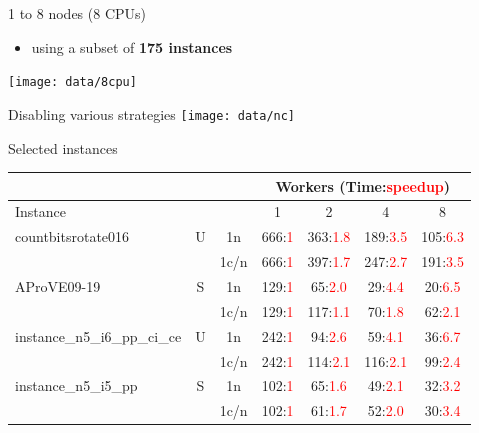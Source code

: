 \documentclass[mathserif,serif]{beamer}
\begin{document}
\begin{frame}{1 to 8 nodes (8 CPUs)}
  \begin{itemize}
    \item using a subset of \textbf{175 instances}
  \end{itemize}
  \centering
  \texttt{[image: data/8cpu]}
\end{frame}

\begin{frame}{Disabling various strategies}
  \texttt{[image: data/nc]}
\end{frame}

\begin{frame}{Selected instances}
  \small

  \begin{tabular}{l | c c | c c c c}
    & & & \multicolumn{4}{c}{Workers (Time:\textcolor{red}{speedup})} \\
    \hline
    Instance & & & 1 & 2 & 4 & 8 \\
    \hline
    countbitsrotate016 & U & 1n & 666:\textcolor{red}{1} & 363:\textcolor{red}{1.8} & 189:\textcolor{red}{3.5} & 105:\textcolor{red}{6.3} \\
                              & & 1c/n & 666:\textcolor{red}{1} & 397:\textcolor{red}{1.7} & 247:\textcolor{red}{2.7} & 191:\textcolor{red}{3.5} \\
    \hline
    AProVE09-19 & S & 1n & 129:\textcolor{red}{1} & 65:\textcolor{red}{2.0} & 29:\textcolor{red}{4.4} & 20:\textcolor{red}{6.5} \\
                & & 1c/n & 129:\textcolor{red}{1} & 117:\textcolor{red}{1.1} & 70:\textcolor{red}{1.8} & 62:\textcolor{red}{2.1} \\
    \hline
    \hline
    instance\_n5\_i6\_pp\_ci\_ce & U & 1n & 242:\textcolor{red}{1} & 94:\textcolor{red}{2.6} & 59:\textcolor{red}{4.1} & 36:\textcolor{red}{6.7}  \\
                                 & & 1c/n & 242:\textcolor{red}{1} & 114:\textcolor{red}{2.1} & 116:\textcolor{red}{2.1} & 99:\textcolor{red}{2.4} \\
    \hline
    instance\_n5\_i5\_pp & S & 1n & 102:\textcolor{red}{1} & 65:\textcolor{red}{1.6} & 49:\textcolor{red}{2.1} & 32:\textcolor{red}{3.2} \\
                         & & 1c/n & 102:\textcolor{red}{1} & 61:\textcolor{red}{1.7} & 52:\textcolor{red}{2.0} & 30:\textcolor{red}{3.4} \\
    \hline

\end{tabular}
\end{frame}
\end{document}

